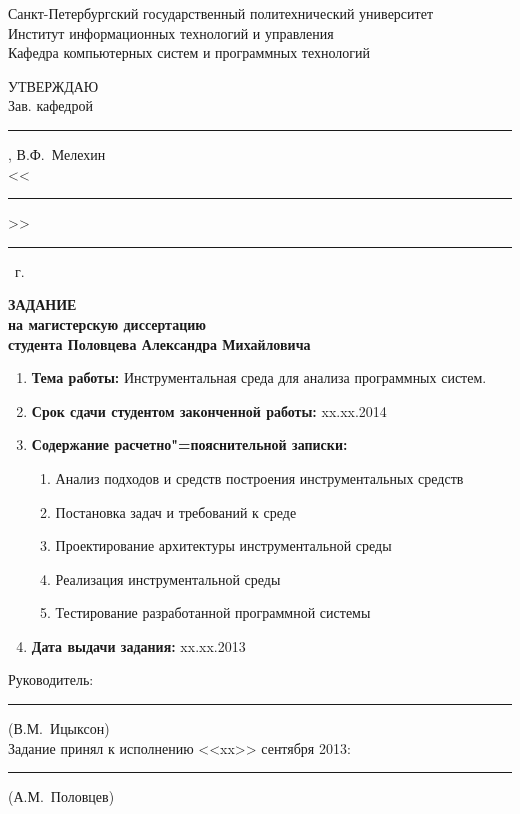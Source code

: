 
\pagestyle{empty}
\begin{center}
    Санкт-Петербургский государственный политехнический университет\\
    Институт информационных технологий и управления \\
    Кафедра компьютерных систем и программных технологий \\
\end{center}
\begin{flushright}
    \MakeUppercase{Утверждаю} \\
    Зав. кафедрой\\
    \rule{5em}{1sp}, В.Ф.~Мелехин\\
    <<\rule{2em}{1sp}>> \rule{7em}{1sp} \the\year~г.
\end{flushright}
\begin{center}
    \bf
    \MakeUppercase{Задание} \\
    на магистерскую диссертацию \\
    студента Половцева Александра Михайловича
\end{center}

\begin{enumerate}
    \item \textbf{Тема работы:} Инструментальная среда для анализа программных
    систем.
    \item \textbf{Срок сдачи студентом законченной работы:} xx.xx.2014
    \item \textbf{Содержание расчетно"=пояснительной записки:}
    \begin{enumerate}[label=\arabic{*})]
        \item Анализ подходов и средств построения инструментальных средств
        \item Постановка задач и требований к среде
        \item Проектирование архитектуры инструментальной среды
        \item Реализация инструментальной среды
        \item Тестирование разработанной программной системы
    \end{enumerate}
    \item \textbf{Дата выдачи задания:} xx.xx.2013
\end{enumerate}

\begin{flushright}
    Руководитель: \rule{7em}{1sp} (В.М.~Ицыксон) \\
    Задание принял к исполнению <<xx>> сентября 2013: \\
    \rule{7em}{1sp} (А.М.~Половцев) \\
\end{flushright}
